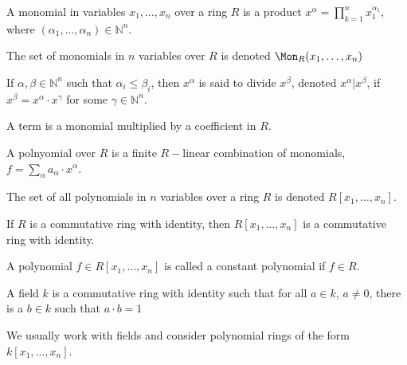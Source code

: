 \documentclass[crop=false,class=article,oneside]{standalone}
\begin{document}
        \begin{definition}
            A monomial in variables $x_1,\hdots, x_n$ over a
            ring $R$ is a product
            $x^\alpha=\prod_{k=1}^{n} x_1^{\alpha_1}$,
            where $(\alpha_1,\hdots,\alpha_n)\in \mathbb{N}^n$.
        \end{definition}
        \begin{notation}
            The set of monomials in $n$ variables over
            $R$ is denoted $\Mon_{R}(x_1,\hdots, x_n)$
        \end{notation}
        \begin{definition}
            If $\alpha,\beta \in \mathbb{N}^n$ such that
            $\alpha_i \leq \beta_i$, then $x^{\alpha}$ is said
            to divide $x^\beta$, denoted $x^\alpha \vert x^\beta$,
            if $x^\beta = x^\alpha \cdot x^\gamma$ for some
            $\gamma\in\mathbb{N}^n$.
        \end{definition}
        \begin{definition}
            A term is a monomial multiplied by a coefficient in $R$.
        \end{definition}
        \begin{definition}
            A polnyomial over $R$ is a finite $R-$linear
            combination of monomials,
            $f=\sum_{\alpha} a_{\alpha}\cdot x^{\alpha}$.
        \end{definition}
        \begin{notation}
            The set of all polynomials in $n$ variables over
            a ring $R$ is denoted $R[x_1,\hdots, x_n]$.
        \end{notation}
        \begin{theorem}
            If $R$ is a commutative ring with identity,
            then $R[x_1,\hdots, x_n]$ is a commutative
            ring with identity.
        \end{theorem}
        \begin{definition}
            A polynomial $f\in R[x_1,\hdots, x_n]$ is
            called a constant polynomial if $f\in R$.
        \end{definition}
        \begin{definition}
            A field $k$ is a commutative ring with identity
            such that for all $a\in k$, $a\ne 0$, there is a
            $b\in k$ such that $a\cdot b=1$
        \end{definition}
        \begin{remark}
            We usually work with fields and consider
            polynomial rings of the form $k[x_1,\hdots ,x_n]$.
        \end{remark}
\end{document}

